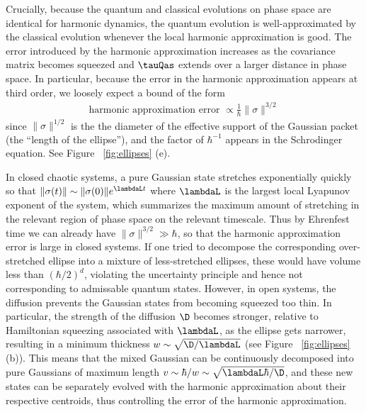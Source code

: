 \documentclass{article}
\numberwithin{equation}{section}
\begin{document}
Crucially, because the quantum and classical evolutions on phase space are identical for harmonic dynamics, the quantum evolution is well-approximated by the classical evolution whenever the local harmonic approximation is good.  The error introduced by the harmonic approximation increases as the covariance
matrix becomes squeezed and $\tauQas$ extends over a larger distance in phase space.  In particular, because the error in the harmonic approximation appears at third order, we loosely expect a bound of the form
\begin{align}
\label{eq:harm-error-intro}
    \textrm{harmonic approximation error } \propto \frac{1}{\hbar} \|\sigma\|^{3/2}
\end{align}
since $\|\sigma\|^{1/2}$ is the the diameter of the effective support of the 
Gaussian packet (the ``length of the ellipse''), and the factor of $\hbar^{-1}$ appears in the Schrodinger
equation. See Figure ~\ref{fig:ellipses} (e).

In closed chaotic systems, a pure Gaussian state stretches exponentially quickly so that $\|\sigma(t)\|\sim \|\sigma(0)\| e^{\lambdaL t}$ where $\lambdaL$ is the largest local Lyapunov exponent of the system, which summarizes the maximum amount of stretching in the relevant region of phase space on the relevant timescale. Thus by Ehrenfest time we can already have $\|\sigma\|^{3/2}\gg \hbar$, so that the harmonic approximation error is large in closed systems.  If one tried to decompose the corresponding over-stretched ellipse into a mixture of less-stretched ellipses, these would have volume less than $(\hbar/2)^d$, violating the uncertainty principle and hence not corresponding to admissable quantum states. However, in open systems, the diffusion 
prevents the Gaussian states from becoming squeezed too thin.  In particular, the strength of the diffusion $\D$ becomes stronger, relative to Hamiltonian squeezing associated with $\lambdaL$, as the ellipse gets narrower, resulting in a minimum thickness $w \sim \sqrt{\D/\lambdaL}$ (see Figure ~\ref{fig:ellipses}(b)).  This means that the mixed Gaussian can be continuously decomposed into pure Gaussians of maximum length $v \sim \hbar/w \sim \sqrt{\lambdaL\hbar/\D}$, and these new states can be separately evolved with the harmonic approximation about their respective centroids, thus controlling the error of the harmonic approximation. 
\end{document}
